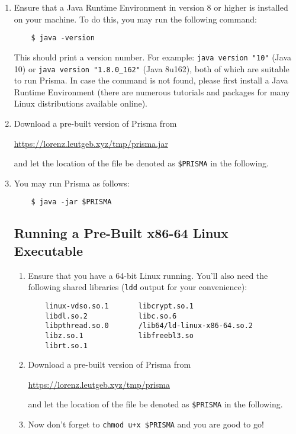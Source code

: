 \documentclass{llncs}
\begin{document}
\begin{enumerate}
	\item{Ensure that a Java Runtime Environment in version 8 or higher is installed on your machine. To do this, you may run the following command:
	\begin{verbatim}
	$ java -version
	\end{verbatim}
	This should print a version number. For example: \texttt{java~version~"10"} (Java 10) or \texttt{java~version~"1.8.0\_162"} (Java 8u162), both of which are suitable to run Prisma. In case the command is not found, please first install a Java Runtime Environment (there are numerous tutorials and packages for many Linux distributions available online).
	}
	\item{Download a pre-built version of Prisma from
	\begin{center}
	\url{https://lorenz.leutgeb.xyz/tmp/prisma.jar}
	\end{center} and let the location of the file be denoted as \texttt{\$PRISMA} in the following.}
	\item{You may run Prisma as follows:
	\begin{verbatim}
	$ java -jar $PRISMA
	\end{verbatim}
	}

\subsection{Running a Pre-Built x86-64 Linux Executable}
\label{sec:runelf}

\begin{enumerate}
\item{Ensure that you have a 64-bit Linux running. You'll also need the following shared libraries (\texttt{ldd} output for your convenience):
	\begin{verbatim}
	linux-vdso.so.1       libcrypt.so.1
	libdl.so.2            libc.so.6
	libpthread.so.0       /lib64/ld-linux-x86-64.so.2
	libz.so.1             libfreebl3.so
	librt.so.1
	\end{verbatim}}
\item{Download a pre-built version of Prisma from
	\begin{center}
	\url{https://lorenz.leutgeb.xyz/tmp/prisma}
	\end{center} and let the location of the file be denoted as \texttt{\$PRISMA} in the following.}
	\item{Now don't forget to \texttt{chmod u+x \$PRISMA} and you are good to go!}
\end{enumerate}


\end{enumerate}
\end{document}
